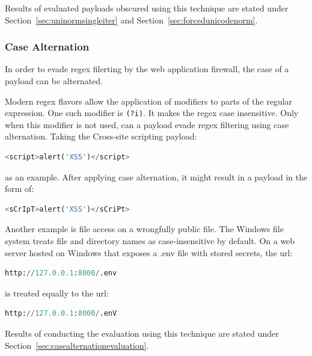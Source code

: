 Results of evaluated payloads obscured using this technique are stated under Section~\ref{sec:uninormsingleiter} and Section~\ref{sec:forcedunicodenorm}.


\subsubsection{Case Alternation}
\label{sec:casealt}
In order to evade regex filerting by the web application firewall, the case of a payload can be alternated. \cite{medium/allypetitt}

Modern regex flavors allow the application of modifiers to parts of the regular expression.
One such modifier is \verb|(?i)|. It makes the regex case insensitive. \cite{regex/jan} Only when this modifier is not used, can a payload evade regex filtering using case alternation.
Taking the Cross-site scripting payload:

\begin{lstlisting}[style=basicStyle, language=Python]
<script>alert('XSS')</script>
\end{lstlisting}

as an example. After applying case alternation, it might result in a payload in the form of:

\begin{lstlisting}[style=basicStyle, language=Python]
<sCrIpT>alert('XSS')</sCriPt>
\end{lstlisting}

Another example is file access on a wrongfully public file.
The Windows file system treats file and directory names as case-insensitive by default. \cite{windows/casesensitive} On a web server hosted on Windows that exposes a .env file with stored secrets, the url:

\begin{lstlisting}[style=basicStyle, language=Python]
http://127.0.0.1:8000/.env
\end{lstlisting}

is treated equally to the url:

\begin{lstlisting}[style=basicStyle, language=Python]
http://127.0.0.1:8000/.enV
\end{lstlisting}

Results of conducting the evaluation using this technique are stated under Section~\ref{sec:casealternationevaluation}.




